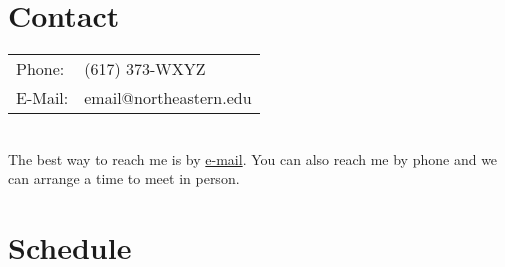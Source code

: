 \documentclass{neu_schedule}
\author{Professor Foo}
\date{Spring 1984}
\begin{document}
\section*{Contact}

\begin{tabular}{l l}
Phone: & (617) 373-WXYZ \\
E-Mail: & email@northeastern.edu \\
\end{tabular}
\\

The best way to reach me is by \underline{e-mail}. You can also reach me by phone and we can arrange a time to meet in person.

\section*{Schedule}

\begin{ScheduleWeek}





\end{ScheduleWeek}
\end{document}
